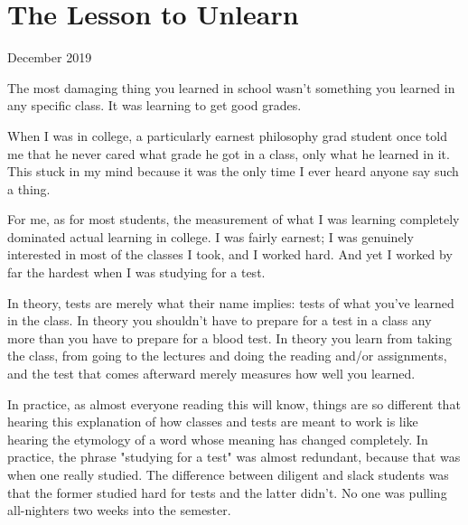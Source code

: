 \chapter{The Lesson to Unlearn}


            
              
                

December 2019


                  The most damaging thing you learned in school wasn't something
                  you learned in any specific class. It was learning to get good
                  grades.

When I was in college, a particularly
                  earnest philosophy grad student once told me that he never
                  cared what grade he got in a class, only what he learned in
                  it. This stuck in my mind because it was the only time I ever
                  heard anyone say such a thing.

For me, as for most
                  students, the measurement of what I was learning completely
                  dominated actual learning in college. I was fairly earnest; I
                  was genuinely interested in most of the classes I took, and I
                  worked hard. And yet I worked by far the hardest when I was
                  studying for a test.

In theory, tests are merely
                  what their name implies: tests of what you've learned in the
                  class. In theory you shouldn't have to prepare for a test in a
                  class any more than you have to prepare for a blood test. In
                  theory you learn from taking the class, from going to the
                  lectures and doing the reading and/or assignments, and the
                  test that comes afterward merely measures how well you
                  learned.

In practice, as almost everyone reading
                  this will know, things are so different that hearing this
                  explanation of how classes and tests are meant to work is like
                  hearing the etymology of a word whose meaning has changed
                  completely. In practice, the phrase "studying for a test" was
                  almost redundant, because that was when one really studied.
                  The difference between diligent and slack students was that
                  the former studied hard for tests and the latter didn't. No
                  one was pulling all-nighters two weeks into the semester.


